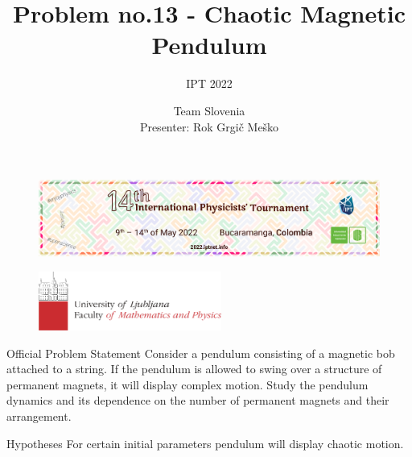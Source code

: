 \documentclass{beamer}
\title[13. Chaotic Magnetic Pendulum]{Problem no.13 - Chaotic Magnetic Pendulum}
\subtitle{IPT 2022}
\author[University of Ljubljana]{Team Slovenia \\ Presenter: Rok Grgič Meško}
\date{\vspace{-5ex}}
\begin{document}
\begin{frame}

\begin{figure}[H]
	\centering
	  \includegraphics[width=\textwidth]{naslovnica_ipt.png}
\end{figure}

\titlepage %

\vspace{-13mm}
\begin{figure}[H]
	\flushleft
	  \includegraphics[width=6cm]{fmf_logo.png}
\end{figure}

\end{frame}





\begin{frame}

\begin{block}{Official Problem Statement}
Consider a pendulum consisting of a magnetic bob attached to a string. If the pendulum is allowed to swing over a structure of permanent magnets, it will display complex motion. Study the pendulum dynamics and its dependence on the number of permanent magnets and their arrangement.
\end{block}

\end{frame}


\begin{frame}

\begin{block}{Hypotheses}
For certain initial parameters pendulum will display chaotic motion.
\end{block}

\end{frame}
\end{document}

